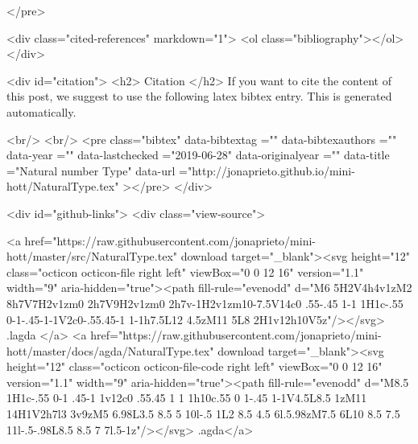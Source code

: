 </pre>


  <div class="cited-references" markdown="1">
  <ol class="bibliography"></ol>
  </div>


  
  <div id="citation">
  <h2> Citation </h2>
  If you want to cite the content of this post,
  we suggest to use the following latex bibtex entry.
  This is generated automatically.

  <br/>
  <br/>
  <pre class="bibtex"
       data-bibtextag =""
       data-bibtexauthors =""
       data-year =""
       data-lastchecked ="2019-06-28"
       data-originalyear =""
       data-title ="Natural number Type"
       data-url ="http://jonaprieto.github.io/mini-hott/NaturalType.tex"
  ></pre>
  </div>
  

  <div id="github-links">
    <div class="view-source">
      
        <a href="https://raw.githubusercontent.com/jonaprieto/mini-hott/master/src/NaturalType.tex" download target="_blank"><svg height="12" class="octicon octicon-file right left" viewBox="0 0 12 16" version="1.1" width="9" aria-hidden="true"><path fill-rule="evenodd" d="M6 5H2V4h4v1zM2 8h7V7H2v1zm0 2h7V9H2v1zm0 2h7v-1H2v1zm10-7.5V14c0 .55-.45 1-1 1H1c-.55 0-1-.45-1-1V2c0-.55.45-1 1-1h7.5L12 4.5zM11 5L8 2H1v12h10V5z"/></svg> .lagda </a>
        <a href="https://raw.githubusercontent.com/jonaprieto/mini-hott/master/docs/agda/NaturalType.tex" download target="_blank"><svg height="12" class="octicon octicon-file-code right left" viewBox="0 0 12 16" version="1.1" width="9" aria-hidden="true"><path fill-rule="evenodd" d="M8.5 1H1c-.55 0-1 .45-1 1v12c0 .55.45 1 1 1h10c.55 0 1-.45 1-1V4.5L8.5 1zM11 14H1V2h7l3 3v9zM5 6.98L3.5 8.5 5 10l-.5 1L2 8.5 4.5 6l.5.98zM7.5 6L10 8.5 7.5 11l-.5-.98L8.5 8.5 7 7l.5-1z"/></svg> .agda</a>
      
